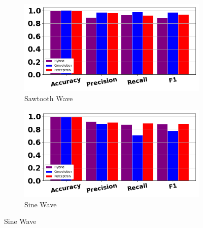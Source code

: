 \documentclass[12pt,letterpaper]{article}
\begin{document}
\begin{figure}[H]
	\begin{subfigure}[b]{0.45\textwidth}
	\centering
	\includegraphics[width=\textwidth]{../FiguresClasses/SawtoothWave}
	\caption{Sawtooth Wave}
	\end{subfigure}	
	\hfill
	\begin{subfigure}[b]{0.45\textwidth}
	\centering
	\includegraphics[width=\textwidth]{../FiguresClasses/SineWave}
	\caption{Sine Wave}
	\end{subfigure}	
	

\end{figure}
\end{document}
